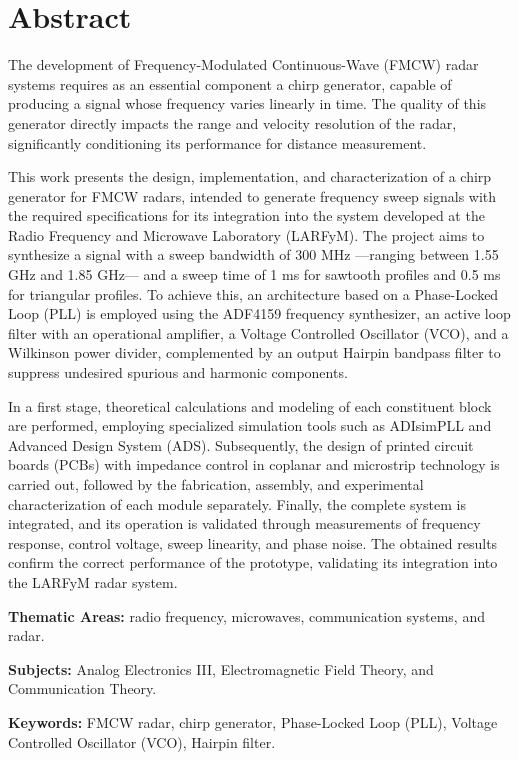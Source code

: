 \chapter*{Abstract} 

The development of Frequency-Modulated Continuous-Wave (FMCW) radar systems requires as an essential component a chirp generator, capable of producing a signal whose frequency varies linearly in time. The quality of this generator directly impacts the range and velocity resolution of the radar, significantly conditioning its performance for distance measurement.

This work presents the design, implementation, and characterization of a chirp generator for FMCW radars, intended to generate frequency sweep signals with the required specifications for its integration into the system developed at the Radio Frequency and Microwave Laboratory (LARFyM). The project aims to synthesize a signal with a sweep bandwidth of 300 MHz —ranging between 1.55 GHz and 1.85 GHz— and a sweep time of 1 ms for sawtooth profiles and 0.5 ms for triangular profiles. To achieve this, an architecture based on a Phase-Locked Loop (PLL) is employed using the ADF4159 frequency synthesizer, an active loop filter with an operational amplifier, a Voltage Controlled Oscillator (VCO), and a Wilkinson power divider, complemented by an output Hairpin bandpass filter to suppress undesired spurious and harmonic components.

In a first stage, theoretical calculations and modeling of each constituent block are performed, employing specialized simulation tools such as ADIsimPLL and Advanced Design System (ADS). Subsequently, the design of printed circuit boards (PCBs) with impedance control in coplanar and microstrip technology is carried out, followed by the fabrication, assembly, and experimental characterization of each module separately. Finally, the complete system is integrated, and its operation is validated through measurements of frequency response, control voltage, sweep linearity, and phase noise. The obtained results confirm the correct performance of the prototype, validating its integration into the LARFyM radar system.

\vspace{1em}
\noindent\textbf{Thematic Areas:} radio frequency, microwaves, communication systems, and radar.

\noindent\textbf{Subjects:} Analog Electronics III, Electromagnetic Field Theory, and Communication Theory. 

\noindent\textbf{Keywords:} FMCW radar, chirp generator, Phase-Locked Loop (PLL), Voltage Controlled Oscillator (VCO), Hairpin filter.